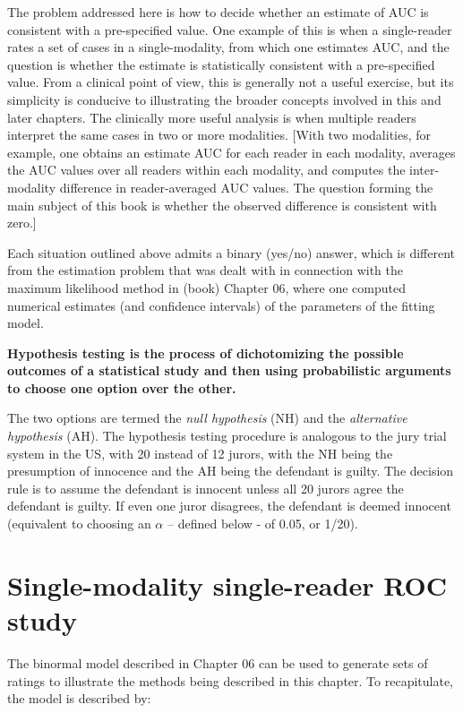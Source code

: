\documentclass[
]{book}
\begin{document}
The problem addressed here is how to decide whether an estimate of AUC is consistent with a pre-specified value. One example of this is when a single-reader rates a set of cases in a single-modality, from which one estimates AUC, and the question is whether the estimate is statistically consistent with a pre-specified value. From a clinical point of view, this is generally not a useful exercise, but its simplicity is conducive to illustrating the broader concepts involved in this and later chapters. The clinically more useful analysis is when multiple readers interpret the same cases in two or more modalities. {[}With two modalities, for example, one obtains an estimate AUC for each reader in each modality, averages the AUC values over all readers within each modality, and computes the inter-modality difference in reader-averaged AUC values. The question forming the main subject of this book is whether the observed difference is consistent with zero.{]}

Each situation outlined above admits a binary (yes/no) answer, which is different from the estimation problem that was dealt with in connection with the maximum likelihood method in (book) Chapter 06, where one computed numerical estimates (and confidence intervals) of the parameters of the fitting model.

\textbf{Hypothesis testing is the process of dichotomizing the possible outcomes of a statistical study and then using probabilistic arguments to choose one option over the other.}

The two options are termed the \emph{null hypothesis} (NH) and the \emph{alternative hypothesis} (AH). The hypothesis testing procedure is analogous to the jury trial system in the US, with 20 instead of 12 jurors, with the NH being the presumption of innocence and the AH being the defendant is guilty. The decision rule is to assume the defendant is innocent unless all 20 jurors agree the defendant is guilty. If even one juror disagrees, the defendant is deemed innocent (equivalent to choosing an \(\alpha\) -- defined below - of 0.05, or 1/20).

\hypertarget{single-modality-single-reader-roc-study}{%
\section{Single-modality single-reader ROC study}\label{single-modality-single-reader-roc-study}}

The binormal model described in Chapter 06 can be used to generate sets of ratings to illustrate the methods being described in this chapter. To recapitulate, the model is described by:
\end{document}
